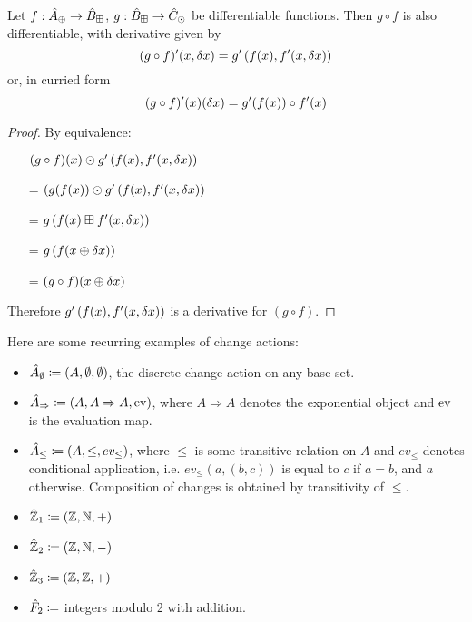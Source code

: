 \begin{thm}
  Let $f: \hat{A}_\oplus \rightarrow \hat{B}_\boxplus$, $g: \hat{B}_\boxplus \rightarrow \hat{C}_\odot$ be differentiable functions. Then $g \circ f$ is also
  differentiable, with derivative given by
   $$(g \circ f)'(x, \delta x) = g'\left(f(x), f'(x, \delta x)\right)$$
   or, in curried form
   $$(g \circ f)'(x)(\delta x) = g'(f(x)) \circ f'(x)$$
\end{thm}
\ifproofs
\begin{proof}
  By equivalence:
  \begin{itemize}
    \item[ ]$(g \circ f)(x) \odot g'\left(f(x), f'(x,\delta x)\right)$
    \item[=]$(g(f(x)) \odot g'\left(f(x), f'(x,\delta x)\right)$
    \item[=]$g\left(f(x) \boxplus f'(x, \delta x) \right)$
    \item[=]$g\left(f(x \oplus \delta x)\right)$
    \item[=]$(g \circ f)(x \oplus \delta x)$
  \end{itemize}
  Therefore $g'\left(f(x), f'(x, \delta x)\right)$ is a
  derivative for $(g \circ f)$.
\end{proof}
\fi

Here are some recurring examples of change actions:
\begin{itemize}
  \item $\hat{A}_\emptyset \coloneqq (A,\emptyset,\emptyset)$, the discrete change action on any base set.
  \item $\hat{A}_\Rightarrow \coloneqq (A,A\Rightarrow A,\operatorname{ev})$, where $A
    \Rightarrow A$ denotes the exponential object and $\operatorname{ev}$ is the evaluation map.
  \item $\hat{A}_\leq \coloneqq (A,\leq,ev_\leq)$, where $\leq$ is some
    transitive relation on $A$ and $ev_\leq$ denotes
    conditional application, i.e. $ev_\leq(a, (b, c))$ is equal to $c$ if $a = b$, and $a$ otherwise. Composition of changes is obtained
    by transitivity of $\leq$.
  \item $\hat{\mathbb{Z}}_1 \coloneqq (\mathbb{Z},\mathbb{N},+)$
  \item $\hat{\mathbb{Z}}_2 \coloneqq (\mathbb{Z},\mathbb{N},-)$
  \item $\hat{\mathbb{Z}}_3 \coloneqq (\mathbb{Z},\mathbb{Z},+)$
  \item $\hat{F}_2 \coloneqq$ integers modulo 2 with addition.
\end{itemize}

